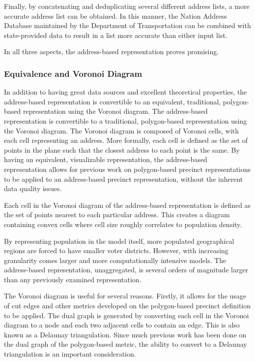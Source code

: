 \documentclass[11pt]{article}
\begin{document}
Finally, by concatenating and deduplicating several different address lists, a more accurate address list can be obtained. In this manner, the Nation Address Database maintained by the Department of Transportation can be combined with state-provided data to result in a list more accurate than either input list.

In all three aspects, the address-based representation proves promising.
\subsubsection{Equivalence and Voronoi Diagram}
\label{sec:org6432cf9}
In addition to having great data sources and excellent theoretical properties, the address-based representation is convertible to an equivalent, traditional, polygon-based representation using the Voronoi diagram. 
The address-based representation is convertible to a traditional, polygon-based representation using the Voronoi diagram. 
The Voronoi diagram is composed of Voronoi cells, with each cell representing an address. 
More formally, each cell is defined as the set of points in the plane such that the closest address to each point is the same.
By having an equivalent, visualizable representation, the address-based representation allows for previous work on polygon-based precinct representations to be applied to an address-based precinct representation, without the inherent data quality issues.

Each cell in the Voronoi diagram of the address-based representation is defined as the set of points nearest to each particular address. This creates a diagram containing convex cells where cell size roughly correlates to population density.

By representing population in the model itself, more populated geographical regions are forced to have smaller voter districts. However, with increasing granularity comes larger and more computationally intensive models. The address-based representation, unaggregated, is several orders of magnitude larger than any previously examined representation.

The Voronoi diagram is useful for several reasons. Firstly, it allows for the usage of cut edges and other metrics developed on the polygon-based precinct definition to be applied. The dual graph is generated by converting each cell in the Voronoi diagram to a node and each two adjacent cells to contain an edge. This is also known as a Delaunay triangulation. Since much previous work has been done on the dual graph of the polygon-based metric, the ability to convert to a Delaunay triangulation is an important consideration.
\end{document}
